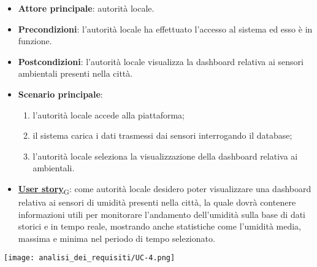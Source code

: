 \begin{itemize}
	\item \textbf{Attore principale}: autorità locale.
	\item \textbf{Precondizioni}: l'autorità locale ha effettuato l'accesso al sistema ed esso è in funzione.
	\item \textbf{Postcondizioni}: l'autorità locale visualizza la dashboard relativa
	      ai sensori ambientali presenti nella città.
	\item \textbf{Scenario principale}:
	      \begin{enumerate}
		      \item l'autorità locale accede alla piattaforma;
		      \item il sistema carica i dati trasmessi dai sensori interrogando il database;
		      \item l'autorità locale seleziona la visualizzazione della dashboard relativa ai ambientali.
	      \end{enumerate}
	\item \href{https://7last.github.io/docs/pb/documentazione-interna/glossario\#user-story}{\textbf{User story}\textsubscript{G}}:
	      come autorità locale desidero poter visualizzare una dashboard relativa ai sensori di umidità presenti nella città, la quale
	      dovrà contenere informazioni utili per monitorare l'andamento dell'umidità sulla base di dati storici e in tempo reale, mostrando
	      anche statistiche come l'umidità media, massima e minima nel periodo di tempo selezionato.
\end{itemize}
\begin{center}
	\texttt{[image: analisi\_dei\_requisiti/UC-4.png]}
\end{center}


